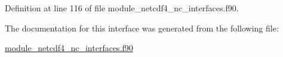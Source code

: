 Definition at line 116 of file module\+\_\+netcdf4\+\_\+nc\+\_\+interfaces.\+f90.



The documentation for this interface was generated from the following file\+:\begin{DoxyCompactItemize}
\item 
\hyperlink{module__netcdf4__nc__interfaces_8f90}{module\+\_\+netcdf4\+\_\+nc\+\_\+interfaces.\+f90}\end{DoxyCompactItemize}
